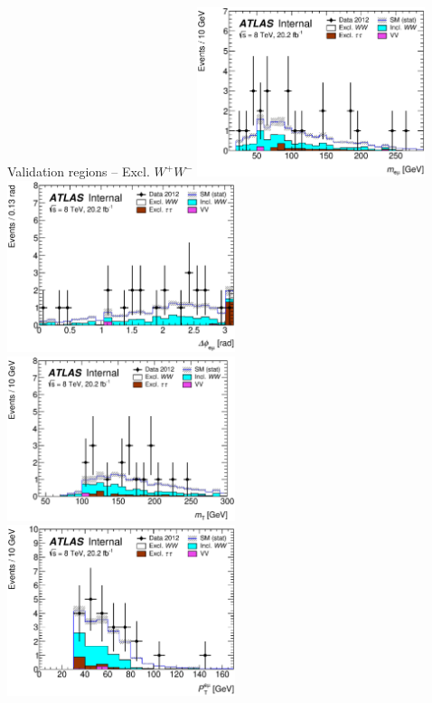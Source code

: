 \documentclass[10pt]{beamer}
\newcommand*{\WW}{\ensuremath{W^+W^-}} %
\begin{document}
\begin{frame}{Validation regions -- Excl. \WW}
   \includegraphics[width=0.5\textwidth]{figures/emme-CutExcl1mm-Mll-lin.eps}
   \includegraphics[width=0.5\textwidth]{figures/emme-CutExcl1mm-DPhill-lin.eps}\\
   \includegraphics[width=0.5\textwidth]{figures/emme-CutExcl1mm-MT-lin.eps}
   \includegraphics[width=0.5\textwidth]{figures/emme-CutExcl1mm-Ptll-lin.eps}
\end{frame}
\end{document}
